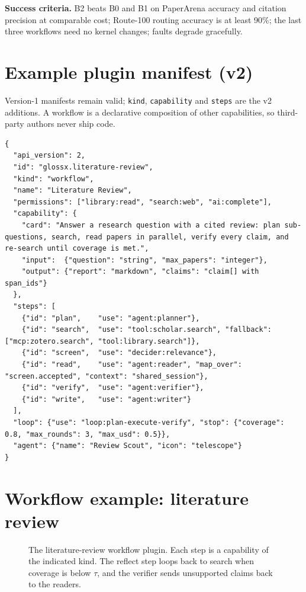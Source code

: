 \documentclass{article}
\begin{document}
\textbf{Success criteria.} B2 beats B0 and B1 on PaperArena accuracy and citation precision at comparable cost; Route-100 routing accuracy is at least 90\%; the last three workflows need no kernel changes; faults degrade gracefully.


{\small }

\newpage
\appendix
\raggedbottom

\section{Example plugin manifest (v2)}
\label{app:manifest}
Version-1 manifests remain valid; \texttt{kind}, \texttt{capability} and \texttt{steps} are the v2 additions. A workflow is a declarative composition of other capabilities, so third-party authors never ship code.
\begin{lstlisting}
{
  "api_version": 2,
  "id": "glossx.literature-review",
  "kind": "workflow",
  "name": "Literature Review",
  "permissions": ["library:read", "search:web", "ai:complete"],
  "capability": {
    "card": "Answer a research question with a cited review: plan sub-questions, search, read papers in parallel, verify every claim, and re-search until coverage is met.",
    "input":  {"question": "string", "max_papers": "integer"},
    "output": {"report": "markdown", "claims": "claim[] with span_ids"}
  },
  "steps": [
    {"id": "plan",    "use": "agent:planner"},
    {"id": "search",  "use": "tool:scholar.search", "fallback": ["mcp:zotero.search", "tool:library.search"]},
    {"id": "screen",  "use": "decider:relevance"},
    {"id": "read",    "use": "agent:reader", "map_over": "screen.accepted", "context": "shared_session"},
    {"id": "verify",  "use": "agent:verifier"},
    {"id": "write",   "use": "agent:writer"}
  ],
  "loop": {"use": "loop:plan-execute-verify", "stop": {"coverage": 0.8, "max_rounds": 3, "max_usd": 0.5}},
  "agent": {"name": "Review Scout", "icon": "telescope"}
}
\end{lstlisting}

\section{Workflow example: literature review}
\begin{figure}[H]
  \centering
  \resizebox{\textwidth}{!}{}
  \caption{The literature-review workflow plugin. Each step is a capability of the indicated kind. The reflect step loops back to search when coverage is below $\tau$, and the verifier sends unsupported claims back to the readers.}
  \label{fig:workflow}
\end{figure}
\end{document}
